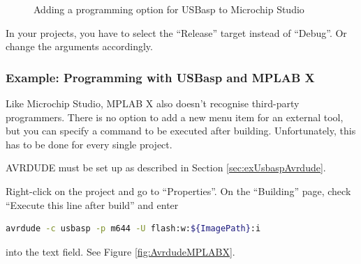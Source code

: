 \documentclass{article}
\newenvironment{note}{\begin{tcolorbox}[colback=blue!5!white,colframe=blue!75!black,title=\textbf{Note}]}{\end{tcolorbox}}
\begin{document}
\begin{figure}[htb]
\centering
{}
\caption{Adding a programming option for USBasp to Microchip Studio}
\label{fig:microchipStudioUSBasp}
\end{figure}

\begin{note}
In your projects, you have to select the ``Release'' target instead of ``Debug''. Or change the arguments accordingly. 
\end{note}

\FloatBarrier
\subsubsection{Example: Programming with USBasp and MPLAB X}\label{sec:exMPLABX}
Like Microchip Studio, MPLAB X also doesn't recognise third-party programmers. There is no option to add a new menu item for an external tool, but you can specify a command to be executed after building. Unfortunately, this has to be done for every single project. 

AVRDUDE must be set up as described in Section \ref{sec:exUsbaspAvrdude}. 

Right-click on the project and go to ``Properties''. On the ``Building'' page, check ``Execute this line after build'' and enter
\begin{lstlisting}[language=bash]
avrdude -c usbasp -p m644 -U flash:w:${ImagePath}:i
\end{lstlisting}
into the text field. See Figure \ref{fig:AvrdudeMPLABX}. 
\end{document}
